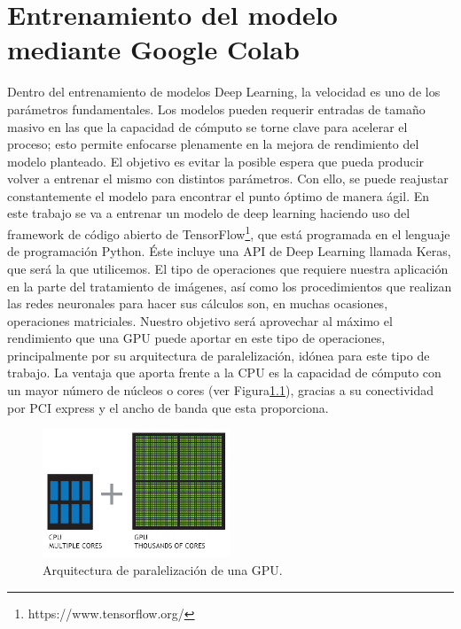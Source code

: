 \mbox{}


\chapter{Entrenamiento del modelo mediante Google Colab}
\label{ch:chapter2}
Dentro del entrenamiento de modelos Deep Learning, la velocidad es uno de los parámetros fundamentales.
Los modelos pueden requerir entradas de tamaño masivo en las que la capacidad de cómputo se torne clave para acelerar el proceso;
esto permite enfocarse plenamente en la mejora de rendimiento del modelo planteado.
El objetivo es evitar la posible espera que pueda producir volver a entrenar el mismo con distintos parámetros.
Con ello, se puede reajustar constantemente el modelo para encontrar el punto óptimo de manera ágil.
En este trabajo se va a entrenar un modelo de deep learning haciendo uso del framework de código abierto de TensorFlow\footnote{https://www.tensorflow.org/}, que está programada en el lenguaje de programación Python.
Éste incluye una API de Deep Learning llamada Keras, que será la que utilicemos.
El tipo de operaciones que requiere nuestra aplicación en la parte del tratamiento de imágenes, así como los procedimientos que realizan las redes neuronales para hacer sus cálculos son, en muchas ocasiones,
operaciones matriciales.
Nuestro objetivo será aprovechar al máximo el rendimiento que una GPU puede aportar en este tipo de operaciones, principalmente por su arquitectura de paralelización, idónea para este tipo de trabajo.
La ventaja que aporta frente a la CPU es la capacidad de cómputo con un mayor número de núcleos o cores (ver Figura\ref{fig:Arquitectura de paralelización de una GPU}), gracias a su conectividad por PCI express y el ancho de banda que esta proporciona.

\begin{figure}
    \centering
    \includegraphics[width=0.5\textwidth]{images/chapter2/cpu-and-gpu.jpg}
    \caption{Arquitectura de paralelización de una GPU.}
    \label{fig:Arquitectura de paralelización de una GPU}
\end{figure}


